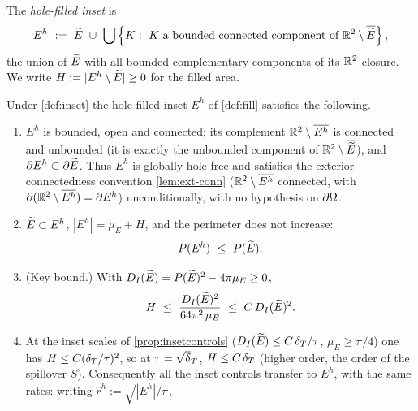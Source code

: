\begin{definition}\label{def:fill}
The \emph{hole-filled inset} is
\begin{equation}\label{eq:fill-def}
   E^h\ :=\ \widetilde{E}\ \cup\ \bigcup\left\{K:\ K\text{ a bounded connected
   component of }\mathbb{R}^2\setminus\overline{\widetilde{E}}\right\},
\end{equation}
the union of $\widetilde{E}$ with all bounded complementary components of its
$\mathbb{R}^2$-closure. We write $H:=|E^h\setminus\widetilde{E}|\ge0$ for the filled area.
\end{definition}

\begin{lemma}\label{lem:fill}
Under \cref{def:inset} the hole-filled inset $E^h$ of \cref{def:fill}
satisfies the following.
\begin{enumerate}[label=\textup{(\alph*)},leftmargin=2.4em]
\item\label{it:fill-top} $E^h$ is bounded, open and connected; its complement
$\mathbb{R}^2\setminus\overline{E^h}$ is connected and unbounded \textup{(}it is
exactly the unbounded component of $\mathbb{R}^2\setminus\overline{\widetilde{E}}$\textup{)},
and $\partial E^h\subset\partial\widetilde{E}$. Thus $E^h$ is globally hole-free and
satisfies the exterior-connectedness convention \cref{lem:ext-conn}
\textup{(}$\mathbb{R}^2\setminus\overline{E^h}$ connected, with
$\partial(\mathbb{R}^2\setminus\overline{E^h})=\partial E^h$\textup{)}
unconditionally, with no hypothesis on $\partial\Omega$.
\item\label{it:fill-per} $\widetilde{E}\subset E^h$, $|E^h|=\mu_E+H$, and the
perimeter does not increase:
\begin{equation}\label{eq:fill-per}
   P(E^h)\ \le\ P(\widetilde{E}).
\end{equation}
\item\label{it:fill-key} \textup{(}Key bound.\textup{)} With
$D_I(\widetilde{E})=P(\widetilde{E})^2-4\pi\mu_E\ge0$,
\begin{equation}\label{eq:fill-key}
   H\ \le\ \frac{D_I(\widetilde{E})^2}{64\pi^2\,\mu_E}\ \le\ C\,D_I(\widetilde{E})^2 .
\end{equation}
\item\label{it:fill-scales} At the inset scales of
\cref{prop:insetcontrols} \textup{(}$D_I(\widetilde{E})\le C\,\delta_T/\tau$,
$\mu_E\ge\pi/4$\textup{)} one has $H\le C(\delta_T/\tau)^2$, so at $\tau=\sqrt\dT$,
$H\le C\,\delta_T$ \textup{(}higher order, the order of the spillover $S$\textup{)}.
Consequently all the inset controls transfer to $E^h$, with the same rates:
writing $\hat r^h:=\sqrt{|E^h|/\pi}$,
\begin{align}

\end{align}
\end{enumerate}
\end{lemma}
